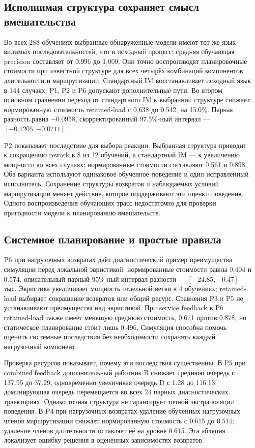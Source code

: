 \subsection{Исполнимая структура сохраняет смысл вмешательства}
Во всех 288 обучениях выбранные обнаруженные модели имеют тот же язык видимых последовательностей, что и исходный процесс; средняя обучающая precision составляет от 0.996 до 1.000. Они точно воспроизводят планировочные стоимости при известной структуре для всех четырёх комбинаций компонентов длительности и маршрутизации. Стандартный IM восстанавливает исходный язык в 144 случаях; P1, P2 и P6 допускают дополнительные пути. Во втором основном сравнении переход от стандартного IM к выбранной структуре снижает нормированную стоимость retained-load с 0.638 до 0.542, на 15.0\%. Парная разность равна $-0.0958$, скорректированный 97.5\%-ный интервал — $[-0.1205,-0.0711]$.

P2 показывает последствие для выбора реакции. Выбранная структура приводит к сокращению rework в 8 из 12 обучений, а стандартный IM — к увеличению мощности во всех случаях; нормированные стоимости составляют 0.561 и 0.898. Оба варианта используют одинаковое обученное поведение и один исправленный исполнитель. Сохранение структуры возвратов и наблюдаемых условий маршрутизации меняет действие, которое поддерживают эти оценки поведения. Одного воспроизведения обучающих трасс недостаточно для проверки пригодности модели к планированию вмешательств.

\subsection{Системное планирование и простые правила}
P6 при нагрузочных возвратах даёт диагностический пример преимущества симуляции перед локальной эвристикой: нормированные стоимости равны 0.404 и 0.574, описательный парный 95\%-ный интервал разности — $[-24.85,-0.47]$ тыс. Эвристика увеличивает мощность отдельной ветви в 4 обучениях; retained-load выбирает сокращение возвратов или общий ресурс. Сравнения P3 и P5 не устанавливают преимущества над эвристикой. При service feedback в P6 retained-load также имеет меньшую среднюю стоимость, 0.671 против 0.878, но статическое планирование стоит лишь 0.496. Симуляция способна помочь оценить системные последствия без необходимости сохранять каждый нагрузочный компонент.

Проверка ресурсов показывает, почему эти последствия существенны. В P5 при combined feedback дополнительный работник B снижает среднюю очередь с 137.95 до 37.29, одновременно увеличивая очередь D с 1.28 до 116.13; доминирующая очередь перемещается во всех 24 парных диагностических траекториях. Однако точная структура не гарантирует точной экстраполяции поведения. В P4 при нагрузочных возвратах удаление обученных нагрузочных членов маршрутизации снижает нормированную стоимость с 0.615 до 0.514; удаление членов длительности оставляет её на уровне 0.615. Эта абляция локализует ошибку решения в оценённых зависимостях возвратов.

